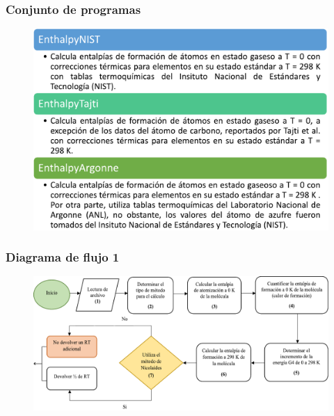 \documentclass{beamer}
\begin{document}
\begin{frame}
\frametitle{Conjunto de programas}
\begin{center}
\begin{figure}[h!]
\includegraphics[scale=.38]{images/programs}
\end{figure}
\end{center}
\end{frame}
\begin{frame}
\frametitle{Diagrama de flujo 1}
\begin{center}
\begin{figure}[h!]
\includegraphics[scale=.47]{images/df1}
\end{figure}
\end{center}
\end{frame}
\end{document}
